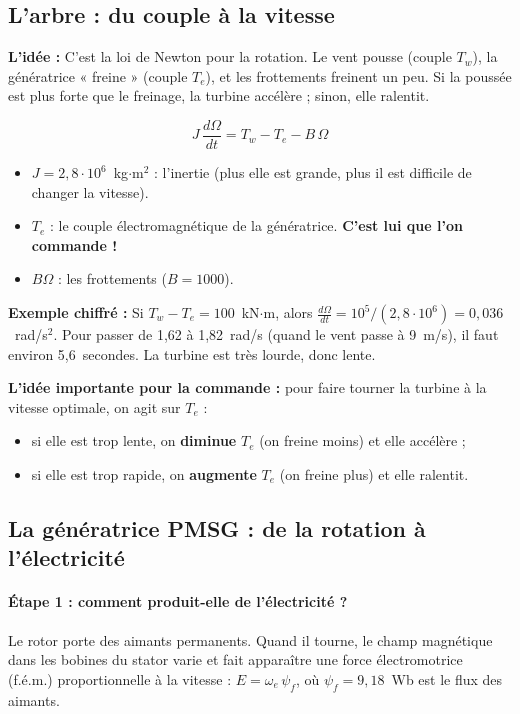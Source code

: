 \documentclass[11pt,a4paper]{article}
\newcommand{\Idee}{\textbf{L'idée : }}
\newcommand{\Exemple}{\textbf{Exemple chiffré : }}
\begin{document}
\subsection{L'arbre : du couple à la vitesse}
\begin{idee}
\Idee
C'est la loi de Newton pour la rotation. Le vent pousse (couple $T_w$), la génératrice « freine »
(couple $T_e$), et les frottements freinent un peu. Si la poussée est plus forte que le freinage, la
turbine accélère ; sinon, elle ralentit.
\end{idee}
\begin{equation}
J\,\frac{d\Omega}{dt} = T_w - T_e - B\,\Omega
\end{equation}
\begin{itemize}
\item $J=2{,}8\cdot10^6$~kg$\cdot$m$^2$ : l'inertie (plus elle est grande, plus il est difficile de changer la vitesse).
\item $T_e$ : le couple électromagnétique de la génératrice. \textbf{C'est lui que l'on commande !}
\item $B\Omega$ : les frottements ($B=1000$).
\end{itemize}

\begin{exemple}
\Exemple
Si $T_w - T_e = 100$~kN$\cdot$m, alors $\frac{d\Omega}{dt} = 10^5/(2{,}8\cdot 10^6) = 0{,}036$~rad/s$^2$.
Pour passer de 1,62 à 1,82~rad/s (quand le vent passe à 9~m/s), il faut environ 5,6~secondes.
La turbine est très lourde, donc lente.
\end{exemple}

\textbf{L'idée importante pour la commande :} pour faire tourner la turbine à la vitesse optimale,
on agit sur $T_e$ :
\begin{itemize}
\item si elle est trop lente, on \textbf{diminue} $T_e$ (on freine moins) et elle accélère ;
\item si elle est trop rapide, on \textbf{augmente} $T_e$ (on freine plus) et elle ralentit.
\end{itemize}

\subsection{La génératrice PMSG : de la rotation à l'électricité}

\paragraph{Étape 1 : comment produit-elle de l'électricité ?}
Le rotor porte des aimants permanents. Quand il tourne, le champ magnétique dans les bobines du stator
varie et fait apparaître une force électromotrice (f.é.m.) proportionnelle à la vitesse :
$E = \omega_e\,\psi_f$, où $\psi_f=9{,}18$~Wb est le flux des aimants.
\end{document}
